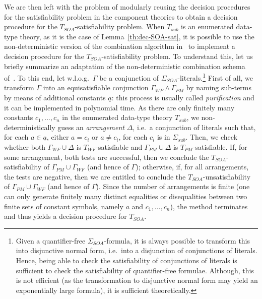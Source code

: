 \documentclass[conference]{IEEEtran}
\begin{document}
\begin{LONG}
We are then left with the problem of modularly reusing the decision
procedures for the satisfiability problem in the component theories to
obtain a decision procedure for the $T_\mathit{SOA}$-satisfiability problem.
When $T_\mathit{sub}$ is an enumerated data-type theory, as it is the case of
Lemma~\ref{th:dec-SOA-sat}, it is possible to use the
non-deterministic version of the combination algorithm
in~\cite{ghilardi-jar} to implement a decision procedure for the
$T_\mathit{SOA}$-satisfiability problem.  To understand this, let us briefly
summarize an adaptation of the non-deterministic combination schema
of~\cite{ghilardi-jar}.  To this end, let w.l.o.g.\ $\Gamma$ be a
conjunction of $\Sigma_\mathit{SOA}$-literals.\footnote{Given a
  quantifier-free $\Sigma_\mathit{SOA}$-formula, it is always possible to
  transform this into disjunctive normal form, i.e.\ into a
  disjunction of conjunctions of literals.  Hence, being able to check
  the satisfiability of conjunctions of literals is sufficient to
  check the satisfiability of quantifier-free formulae.  Although,
  this is not efficient (as the transformation to disjunctive normal
  form may yield an exponentially large formula), it is sufficient
  theoretically.}  First of all, we transform $\Gamma$ into an
equisatisfiable conjunction $\Gamma_\mathit{WF}\wedge \Gamma_\mathit{PM}$ by naming
sub-terms by means of additional constants $\underline{a}$: this
process is usually called \emph{purification} and it can be implemented
in polynomial time.  As there are only finitely many constants $c_1,
..., c_n$ in the enumerated data-type theory $T_\mathit{sub}$, we
non-deterministically guess an \emph{arrangement} $\Delta$, i.e.\ a
conjunction of literals such that, for each $a\in \underline{a}$,
either $a=c_i$ or $a\neq c_i$, for each $c_i$ is in $\Sigma_\mathit{sub}$.
Then, we check whether both $\Gamma_\mathit{WF}\cup \Delta$ is
$T_\mathit{WF}$-satisfiable and $\Gamma_\mathit{PM}\cup \Delta$ is
$T_\mathit{PM}$-satisfiable.  If, for some arrangement, both tests are
successful, then we conclude the $T_\mathit{SOA}$-satisfiability of
$\Gamma_\mathit{PM}\cup \Gamma_\mathit{WF}$ (and hence of $\Gamma$); otherwise, if,
for all arrangements, the tests are negative, then we are entitled to
conclude the $T_\mathit{SOA}$-unsatisfiability of $\Gamma_\mathit{PM}\cup
\Gamma_\mathit{WF}$ (and hence of $\Gamma$).  Since the number of arrangements
is finite (one can only generate finitely many distinct equalities or
disequalities between two finite sets of constant symbols, namely
$\underline{a}$ and $c_1, ..., c_n$), the method terminates and thus
yields a decision procedure for $T_\mathit{SOA}$.


\end{LONG}
\end{document}
